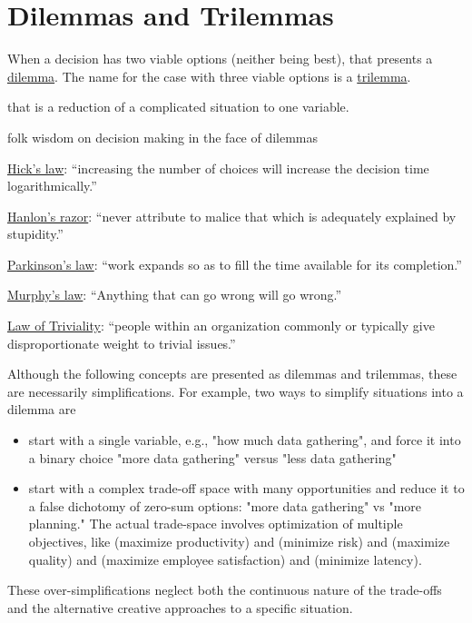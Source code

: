 \section{Dilemmas and Trilemmas\label{sec:dilemma_trilemma}}

When a decision has two viable options (neither being best), that presents a \href{https://en.wikipedia.org/wiki/Dilemma}{dilemma}. The name for the case with three viable options is a \href{https://en.wikipedia.org/wiki/Trilemma}{trilemma}. 

 that is a reduction of a complicated situation to one variable. 

folk wisdom on decision making in the face of dilemmas

\href{https://en.wikipedia.org/wiki/Hick\%27s_law}{Hick's law}: ``increasing the number of choices will increase the decision time logarithmically.''

\href{https://en.wikipedia.org/wiki/Hanlon\%27s_razor}{Hanlon's razor}: ``never attribute to malice that which is adequately explained by stupidity.''

\href{https://en.wikipedia.org/wiki/Parkinson\%27s_law}{Parkinson's law}: ``work expands so as to fill the time available for its completion.''

\href{https://en.wikipedia.org/wiki/Murphy\%27s_law}{Murphy's law}: ``Anything that can go wrong will go wrong.''

\href{https://en.wikipedia.org/wiki/Law_of_triviality}{Law of Triviality}: ``people within an organization commonly or typically give disproportionate weight to trivial issues.''


Although the following concepts are presented as dilemmas and trilemmas, these are necessarily simplifications. For example, two ways to simplify situations into a dilemma are
\begin{itemize}
    \item start with a single variable, e.g., "how much data gathering", and force it into a binary choice "more data gathering" versus "less data gathering"
    \item start with a complex trade-off space with many opportunities and reduce it to a false dichotomy of zero-sum options: "more data gathering" vs "more planning." The actual trade-space involves optimization of multiple objectives, like (maximize productivity) and (minimize risk) and (maximize quality) and (maximize employee satisfaction) and (minimize latency). 
\end{itemize}
These over-simplifications neglect both the continuous nature of the trade-offs and the alternative creative approaches to a specific situation. 


